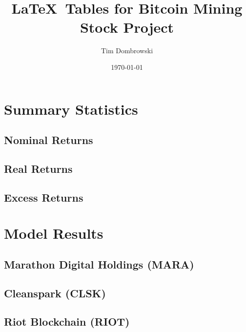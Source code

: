 \documentclass[]{article}
\title{\LaTeX~Tables for Bitcoin Mining Stock Project}
\author{Tim Dombrowski}
\date{\today}
\begin{document}
\maketitle

\large

\section{Summary Statistics}

\subsection{Nominal Returns}



\pagebreak

\subsection{Real Returns}




\subsection{Excess Returns}



\pagebreak

\section{Model Results}

\subsection{Marathon Digital Holdings (MARA)}



\pagebreak

\subsection{Cleanspark (CLSK)}



\pagebreak

\subsection{Riot Blockchain (RIOT)}
\end{document}
